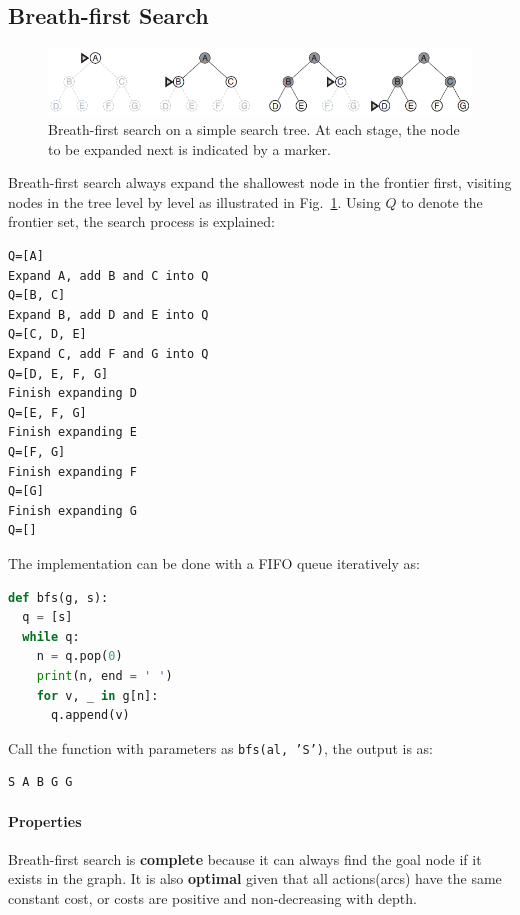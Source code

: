 \documentclass[../main.tex]{subfiles}
\begin{document}
\subsection{Breath-first Search}
\begin{figure}[!ht]
    \centering
    \includegraphics[width=0.96\columnwidth]{fig/general_breath_first_search.png}
        \caption{Breath-first search on a simple search tree. At each stage, the node to be expanded next is indicated by a marker. }
    \label{fig:breath_first_search_strategy}
\end{figure}
Breath-first search always expand the shallowest node in the frontier first, visiting nodes in the tree level by level as illustrated in Fig.~\ref{fig:breath_first_search_strategy}. Using $Q$ to denote the frontier set, the search process is explained:
\begin{lstlisting}[numbers=none]
Q=[A]
Expand A, add B and C into Q
Q=[B, C]
Expand B, add D and E into Q
Q=[C, D, E]
Expand C, add F and G into Q
Q=[D, E, F, G]
Finish expanding D
Q=[E, F, G]
Finish expanding E
Q=[F, G]
Finish expanding F
Q=[G]
Finish expanding G
Q=[]
\end{lstlisting}
The implementation can be done with a FIFO queue iteratively as:
\begin{lstlisting}[language=Python]
def bfs(g, s):
  q = [s]
  while q:
    n = q.pop(0)
    print(n, end = ' ')
    for v, _ in g[n]:
      q.append(v)
\end{lstlisting}
Call the function with parameters as \texttt{bfs(al, 'S')}, the output is as:
\begin{lstlisting}[numbers=none]
S A B G G 
\end{lstlisting}


\paragraph{Properties} Breath-first search is \textbf{complete} because it can always find the goal node if it exists in the graph. It is also \textbf{optimal} given that all actions(arcs) have the same constant cost, or costs are positive and non-decreasing with depth. 
\end{document}
